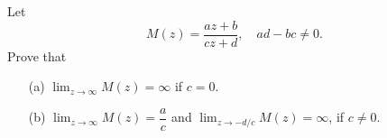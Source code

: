 \vspace{0.1in}

\begin{problem}\label{prob 5.5}
Let \[M(z) = \dfrac{az + b}{cz + d},\quad ad-bc \neq 0.\] Prove that
\begin{itemize}
\item[(a)] $\displaystyle\lim_{z \to \infty} M(z) = \infty$ if $c = 0$.
\item[(b)] $\displaystyle\lim_{z \to \infty} M(z) = \dfrac{a}{c}$ and $\displaystyle\lim_{z \to -d/c}M(z) = \infty$, if $c \neq 0$.
\end{itemize}
\end{problem}
